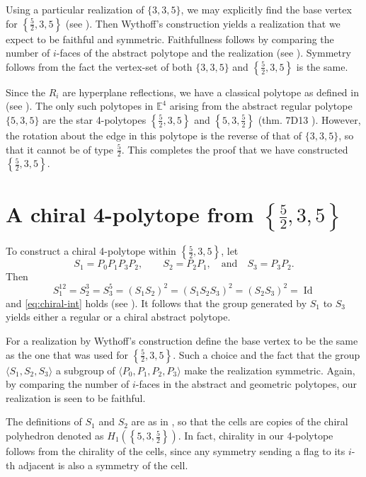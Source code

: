 \documentclass{article}
\theoremstyle{definition}
\DeclareMathOperator{\Id}{Id}
\begin{document}
	Using a particular realization of $\{3,3,5\}$, we may explicitly find the base vertex for $\left\{\frac{5}{2},3,5\right\}$ (see ). Then Wythoff's construction yields a realization that we expect to be faithful and symmetric. Faithfullness follows by comparing the number of $i$-faces of the abstract polytope and the realization (see ). Symmetry follows from the fact the vertex-set of both $\{3,3,5\}$ and $\left\{\frac{5}{2},3,5\right\}$ is the same.
	
	Since the $R_i$ are hyperplane reflections, we have a classical polytope as defined in  (see \cite{mcmullen-4dimensional}). The only such polytopes in $\mathbb{E}^4$ arising from the abstract regular polytope $\{5,3,5\}$ are the star 4-polytopes $\left\{\frac{5}{2},3,5\right\}$ and $\left\{5,3,\frac{5}{2}\right\}$ (thm. 7D13 \cite{abstract-polytopes}). However, the rotation about the edge in this polytope is the reverse of that of $\{3,3,5\}$, so that it cannot be of type $\frac{5}{2}$. This completes the proof that we have constructed $\left\{\frac{5}{2},3,5\right\}$.
	
	\section{A chiral 4-polytope from $\left\{\frac{5}{2},3,5\right\}$}
	To construct a chiral 4-polytope within $\left\{\frac{5}{2},3,5\right\}$, let
		\[S_1=P_0P_1P_3P_2,\qquad S_2=P_2P_1,\quad\text{and}\quad S_3=P_3P_2.\]
	Then
	\begin{equation}\label{eq:string-chiral}
		S_1^{12}=S_2^3=S_3^5=(S_1S_2)^2=(S_1S_2S_3)^2=(S_2S_3)^2=\Id
	\end{equation}
	and \cref{eq:chiral-int} holds (see ). It follows that the group generated by $S_1$ to $S_3$ yields either a regular or a chiral abstract polytope.
	
	For a realization by Wythoff's construction define the base vertex to be the same as the one that was used for $\left\{\frac{5}{2},3,5\right\}$. Such a choice and the fact that the group $\langle S_1,S_2,S_3\rangle$ a subgroup of $\langle P_0,P_1,P_2,P_3\rangle$ make the realization symmetric. Again, by comparing the number of $i$-faces in the abstract and geometric polytopes, our realization is seen to be faithful.
	
	The definitions of $S_1$ and $S_2$ are as in  \cite{petcox}, so that the cells are copies of the chiral polyhedron denoted as $H_1(\left\{5,3,\frac{5}{2}\right\})$. In fact, chirality in our 4-polytope follows from the chirality of the cells, since any symmetry sending a flag to its $i$-th adjacent is also a symmetry of the cell.
	
\end{document}
